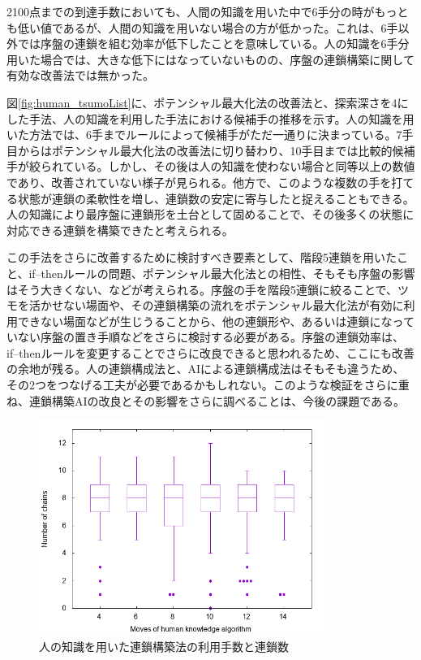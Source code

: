 \documentclass[12pt]{jarticle}
\begin{document}
2100点までの到達手数においても、人間の知識を用いた中で6手分の時がもっとも低い値であるが、人間の知識を用いない場合の方が低かった。これは、6手以外では序盤の連鎖を組む効率が低下したことを意味している。人の知識を6手分用いた場合では、大きな低下にはなっていないものの、序盤の連鎖構築に関して有効な改善法では無かった。

図\ref{fig:human_tsumoList}に、ポテンシャル最大化法の改善法と、探索深さを4にした手法、人の知識を利用した手法における候補手の推移を示す。人の知識を用いた方法では、6手までルールによって候補手がただ一通りに決まっている。7手目からはポテンシャル最大化法の改善法に切り替わり、10手目までは比較的候補手が絞られている。しかし、その後は人の知識を使わない場合と同等以上の数値であり、改善されていない様子が見られる。他方で、このような複数の手を打てる状態が連鎖の柔軟性を増し、連鎖数の安定に寄与したと捉えることもできる。人の知識により最序盤に連鎖形を土台として固めることで、その後多くの状態に対応できる連鎖を構築できたと考えられる。

この手法をさらに改善するために検討すべき要素として、階段5連鎖を用いたこと、if--thenルールの問題、ポテンシャル最大化法との相性、そもそも序盤の影響はそう大きくない、などが考えられる。序盤の手を階段5連鎖に絞ることで、ツモを活かせない場面や、その連鎖構築の流れをポテンシャル最大化法が有効に利用できない場面などが生じうることから、他の連鎖形や、あるいは連鎖になっていない序盤の置き手順などをさらに検討する必要がある。序盤の連鎖効率は、if--thenルールを変更することでさらに改良できると思われるため、ここにも改善の余地が残る。人の連鎖構成法と、AIによる連鎖構成法はそもそも違うため、その2つをつなげる工夫が必要であるかもしれない。このような検証をさらに重ね、連鎖構築AIの改良とその影響をさらに調べることは、今後の課題である。

\begin{figure}[hbt]
  \begin{center}
  \includegraphics[height=7cm]{experiment/HumanKnowledge/human_chain.png}
  \caption{人の知識を用いた連鎖構築法の利用手数と連鎖数} \label{fig:human_chain}
\end{center}
\end{figure}
\end{document}
